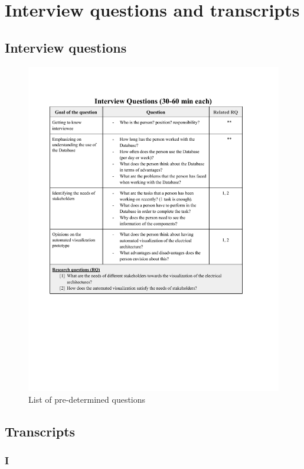 \chapter{Interview questions and transcripts}
\label{app2}

\section{Interview questions}
\begin{figure}[H]
\centering
\captionsetup{justification=centering}
\vspace{0cm}%
\includegraphics[width=1\linewidth]{figure/misc/interview_questions.pdf}
\caption{List of pre-determined questions}
\label{fig:interview_questions}
\end{figure}

\section{Transcripts}
\subsection{I}

